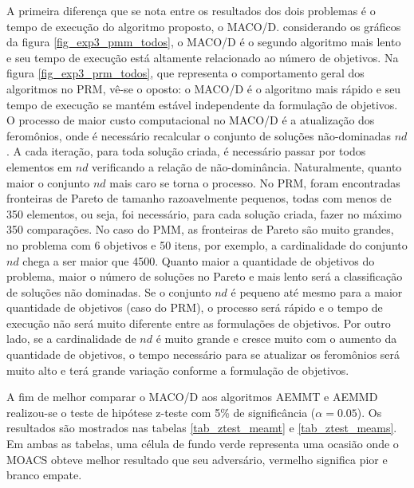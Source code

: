 A primeira diferença que se nota entre os resultados dos dois problemas é o tempo de execução do algoritmo proposto, o MACO/D. considerando os gráficos da figura \ref{fig_exp3_pmm_todos}, o MACO/D é o segundo algoritmo mais lento e seu tempo de execução está altamente relacionado ao número de objetivos. Na figura \ref{fig_exp3_prm_todos}, que representa o comportamento geral dos algoritmos no PRM, vê-se o oposto: o MACO/D é o algoritmo mais rápido e seu tempo de execução se mantém estável independente da formulação de objetivos. O processo de maior custo computacional no MACO/D é a atualização dos feromônios, onde é necessário recalcular o conjunto de soluções não-dominadas $nd$. A cada iteração, para toda solução criada, é necessário passar por todos elementos em $nd$ verificando a relação de não-dominância. Naturalmente, quanto maior o conjunto $nd$ mais caro se torna o processo. No PRM, foram encontradas fronteiras de Pareto de tamanho razoavelmente pequenos, todas com menos de 350 elementos, ou seja, foi necessário, para cada solução criada, fazer no máximo 350 comparações. No caso do PMM, as fronteiras de Pareto são muito grandes, no problema com 6 objetivos e 50 itens, por exemplo, a cardinalidade do conjunto $nd$ chega a ser maior que 4500. Quanto maior a quantidade de objetivos do problema, maior o número de soluções no Pareto e mais lento será a classificação de soluções não dominadas. Se o conjunto $nd$ é pequeno até mesmo para a maior quantidade de objetivos (caso do PRM), o processo será rápido e o tempo de execução não será muito diferente entre as formulações de objetivos. Por outro lado, se a cardinalidade de $nd$ é muito grande e cresce muito com o aumento da quantidade de objetivos, o tempo necessário para se atualizar os feromônios será muito alto e terá grande variação conforme a formulação de objetivos.

A fim de melhor comparar o MACO/D aos algoritmos AEMMT e AEMMD realizou-se o teste de hipótese z-teste com 5\% de significância ($\alpha=0.05$). Os resultados são mostrados nas tabelas \ref{tab_ztest_meamt} e \ref{tab_ztest_meams}. Em ambas as tabelas, uma célula de fundo verde representa uma ocasião onde o MOACS obteve melhor resultado que seu adversário, vermelho significa pior e branco empate.

